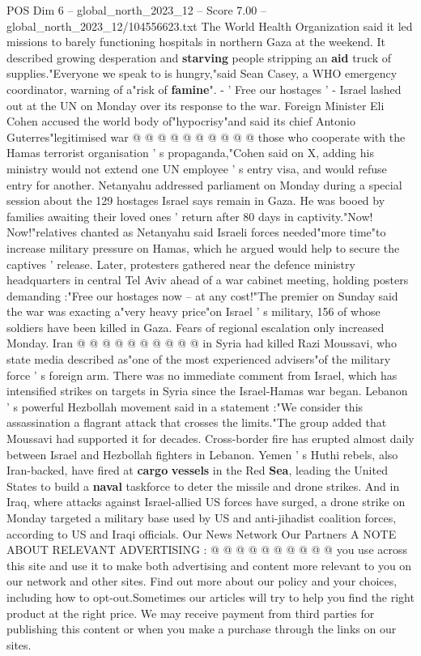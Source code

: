 \begin{textsample}{POS Dim 6 – global\_north\_2023\_12 – Score 7.00 – global\_north\_2023\_12/104556623.txt}
The World Health Organization said it led missions to barely functioning hospitals in northern Gaza at the weekend.
It described growing desperation and \textbf{starving} people stripping an \textbf{aid} truck of supplies."Everyone we speak to is hungry,"said Sean Casey, a WHO emergency coordinator, warning of a"risk of \textbf{famine}". - ' Free our hostages ' - Israel lashed out at the UN on Monday over its response to the war.
Foreign Minister Eli Cohen accused the world body of"hypocrisy"and said its chief Antonio Guterres"legitimised war @ @ @ @ @ @ @ @ @ @ those who cooperate with the Hamas terrorist organisation ' s propaganda,"Cohen said on X, adding his ministry would not extend one UN employee ' s entry visa, and would refuse entry for another.
Netanyahu addressed parliament on Monday during a special session about the 129 hostages Israel says remain in Gaza.
He was booed by families awaiting their loved ones ' return after 80 days in captivity."Now!
Now!"relatives chanted as Netanyahu said Israeli forces needed"more time"to increase military pressure on Hamas, which he argued would help to secure the captives ' release.
Later, protesters gathered near the defence ministry headquarters in central Tel Aviv ahead of a war cabinet meeting, holding posters demanding :"Free our hostages now -- at any cost!"The premier on Sunday said the war was exacting a"very heavy price"on Israel ' s military, 156 of whose soldiers have been killed in Gaza.
Fears of regional escalation only increased Monday.
Iran @ @ @ @ @ @ @ @ @ @ in Syria had killed Razi Moussavi, who state media described as"one of the most experienced advisers"of the military force ' s foreign arm.
There was no immediate comment from Israel, which has intensified strikes on targets in Syria since the Israel-Hamas war began.
Lebanon ' s powerful Hezbollah movement said in a statement :"We consider this assassination a flagrant attack that crosses the limits."The group added that Moussavi had supported it for decades.
Cross-border fire has erupted almost daily between Israel and Hezbollah fighters in Lebanon.
Yemen ' s Huthi rebels, also Iran-backed, have fired at \textbf{cargo} \textbf{vessels} in the Red \textbf{Sea}, leading the United States to build a \textbf{naval} taskforce to deter the missile and drone strikes.
And in Iraq, where attacks against Israel-allied US forces have surged, a drone strike on Monday targeted a military base used by US and anti-jihadist coalition forces, according to US and Iraqi officials.
Our News Network Our Partners A NOTE ABOUT RELEVANT ADVERTISING : @ @ @ @ @ @ @ @ @ @ you use across this site and use it to make both advertising and content more relevant to you on our network and other sites.
Find out more about our policy and your choices, including how to opt-out.Sometimes our articles will try to help you find the right product at the right price.
We may receive payment from third parties for publishing this content or when you make a purchase through the links on our sites.

\end{textsample}
